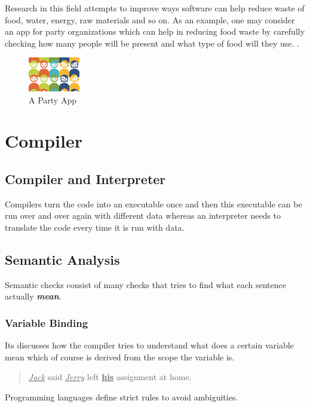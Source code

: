 \documentclass{article}
\begin{document}
\begin{multicols}{2}
Research in this field attempts to improve ways software can help reduce waste of food, water, energy, raw materials and so on. As an example, one may consider an app for party organizations which can help in reducing food waste by carefully checking how many people will be present and what type of food will they use. \cite{leicester}.


\begin{figure}[h]
	\centering
		\includegraphics[width=0.2\textwidth]{images/partyapp.png}
		\caption {A Party App}
	\label{fig:Multimeter}
\end{figure}


\section{Compiler}
\subsection{Compiler and Interpreter}
Compilers turn the code into an executable once and then this executable can be run over and over again with different data whereas an interpreter needs to translate the code every time it is run with data.

\subsection{Semantic Analysis}
Semantic checks consist of many checks that tries to find what each sentence actually \textbf{\textit{mean}}.

\subsubsection{Variable Binding}
Its discusses how the compiler tries to understand what does a certain variable mean which of course is derived from the scope the variable is.

\begin{quotation}
\underline{\textit{Jack}} said \underline{\textit{Jerry}} left \underline{\textbf{his}} assignment at home.

\end{quotation}

Programming languages define strict rules to avoid ambiguities.


\end{multicols}
\end{document}
